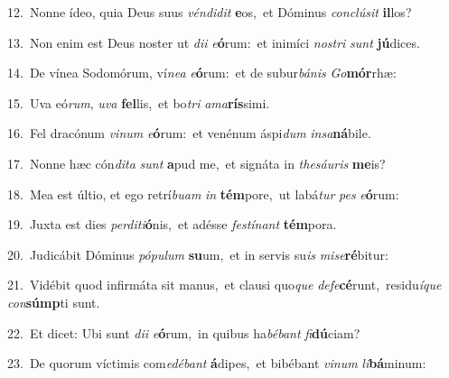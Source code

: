 {\numbfont\textcolor{\numbcolor}{12.}}~Nonne ídeo, quia Deus suus \textit{vén}\-\textit{di}\textit{dit} \textbf{e}\-os,~\star et Dóminus \textit{con}\-\textit{clú}\textit{sit} \textbf{il}\-los?\par
{\numbfont\textcolor{\numbcolor}{13.}}~Non enim est Deus noster ut \textit{di}\-\textit{i} \textit{e}\-\textbf{ó}rum:~\star et inimíci \textit{nos}\-\textit{tri} \textit{sunt} \textbf{jú}\-dices.\par
{\numbfont\textcolor{\numbcolor}{14.}}~De vínea Sodomórum, ví\-\textit{ne}\-\textit{a} \textit{e}\-\textbf{ó}rum:~\star et de subur\-\textit{bá}\-\textit{nis} \textit{Go}\-\textbf{mór}rhæ:\par
{\numbfont\textcolor{\numbcolor}{15.}}~Uva eó\-\textit{rum}\-, \textit{u}\-\textit{va} \textbf{fel}\-lis,~\star et bo\textit{tri} \textit{a}\-\textit{ma}\textbf{rís}simi.\par
{\numbfont\textcolor{\numbcolor}{16.}}~Fel dracónum \textit{vi}\-\textit{num} \textit{e}\-\textbf{ó}rum:~\star et venénum áspi\textit{dum} \textit{in}\-\textit{sa}\textbf{ná}bile.\par
{\numbfont\textcolor{\numbcolor}{17.}}~Nonne hæc cón\-\textit{di}\-\textit{ta} \textit{sunt} \textbf{a}\-pud me,~\star et signáta in \textit{the}\-\textit{sáu}\textit{ris} \textbf{me}\-is?\par
{\numbfont\textcolor{\numbcolor}{18.}}~Mea est últio, et ego retrí\-\textit{bu}\-\textit{am} \textit{in} \textbf{tém}\-pore,~\star ut labá\textit{tur} \textit{pes} \textit{e}\-\textbf{ó}rum:\par
{\numbfont\textcolor{\numbcolor}{19.}}~Juxta est dies \textit{per}\-\textit{di}\textit{ti}\textbf{ó}nis,~\star et adésse \textit{fes}\-\textit{tí}\textit{nant} \textbf{tém}\-pora.\par
{\numbfont\textcolor{\numbcolor}{20.}}~Judicábit Dóminus \textit{pó}\-\textit{pu}\textit{lum} \textbf{su}\-um,~\star et in servis su\textit{is} \textit{mi}\-\textit{se}\textbf{ré}bitur:\par
{\numbfont\textcolor{\numbcolor}{21.}}~Vidébit quod infirmáta sit manus,~\dagger et clausi quo\textit{que} \textit{de}\-\textit{fe}\textbf{cé}runt,~\star residu\-\textit{í}\-\textit{que} \textit{con}\-\textbf{súmp}ti sunt.\par
{\numbfont\textcolor{\numbcolor}{22.}}~Et dicet: Ubi sunt \textit{di}\-\textit{i} \textit{e}\-\textbf{ó}rum,~\star in quibus ha\-\textit{bé}\-\textit{bant} \textit{fi}\-\textbf{dú}ciam?\par
{\numbfont\textcolor{\numbcolor}{23.}}~De quorum víctimis com\-\textit{e}\-\textit{dé}\textit{bant} \textbf{á}\-dipes,~\star et bibébant \textit{vi}\-\textit{num} \textit{li}\-\textbf{bá}minum:\par
